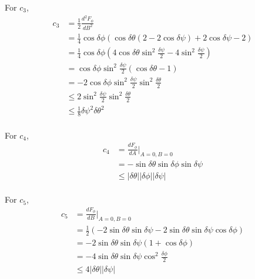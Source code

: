 \documentclass[12pt]{article}
\begin{document}
For $c_3$,
\begin{align*}
c_3 &=   \frac{1}{2} \frac{d^2F_\phi}{dB^2}\\
       &=\frac{1}{4} \cos \delta \phi  (\cos \delta \theta  (2-2 \cos \delta \psi )+2 \cos \delta \psi -2)\\
       &=\frac{1}{4} \cos \delta \phi  (4\cos \delta \theta  \sin^2 \frac{\delta \psi}{2} -4 \sin^2 \frac{\delta \psi}{2})\\
       &= \cos \delta \phi \sin^2 \frac{\delta \psi}{2}( \cos\delta \theta - 1)\\
       &= -2\cos \delta \phi \sin^2 \frac{\delta \psi}{2}\sin^2\frac{\delta \theta}{2}\\
       &\leq  2 \sin^2 \frac{\delta \psi}{2}\sin^2\frac{\delta \theta}{2}\\
       &\leq  \frac{1}{8} \delta \psi ^2\delta \theta^2
 \end{align*}\\
 
 For $c_4$,
\begin{align*}
c_4 &=   \frac{dF_\phi}{dA}\bigg|_{A=0, B=0}\\
      &= - \sin\delta \theta \sin \delta \phi \sin \delta \psi\\
      &\leq |\delta \theta||\delta \phi||\delta \psi|
 \end{align*}\\
 
  For $c_5$,
\begin{align*}
c_5 &=   \frac{dF_\phi}{dB}\bigg|_{A=0, B=0}\\
      &= \frac{1}{2} (-2 \sin \delta \theta  \sin \delta \psi -2 \sin \delta \theta  \sin\delta \psi  \cos \delta \phi)\\
      &= -2 \sin \delta \theta  \sin \delta \psi (1+\cos \delta \phi)\\
      &= -4 \sin \delta \theta  \sin \delta \psi \cos^2 \frac{\delta \phi}{2}\\
      &\leq 4  |\delta \theta|  |\delta \psi|
\end{align*}\\
\end{document}
